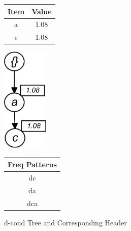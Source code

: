 %
\begin{figure}
\begin{minipage}{0.40\textwidth}
  \centering
	\begin{center}
	\begin{tabular}{ |c|c| } 
 	\hline
 		Item&Value\\ \hline\hline
 		a &  1.08  	\\ \hline
 		c &  1.08   	\\ \hline
 		
\end{tabular}
\end{center}  
\end{minipage}
  \hfill
\hfill
\begin{minipage}{0.23\textwidth}
  \centering
  \hfill
  \includegraphics[width=.8\textwidth, height=5cm]{images/D_COND.jpg}
  \hfill
\end{minipage}
\hfill
\begin{minipage}{0.30\textwidth}
  \centering
  
	\begin{center}
	\begin{tabular}{ |c| } 
 	\hline
 		Freq Patterns \\ \hline\hline
 		dc  	\\ \hline
 		da   	\\ \hline
 		dca   	\\ \hline
 		
\end{tabular}
\end{center}  
\end{minipage}
\caption{d-cond Tree and Corresponding Header}
\label{figure:d_cond}
\end{figure}
